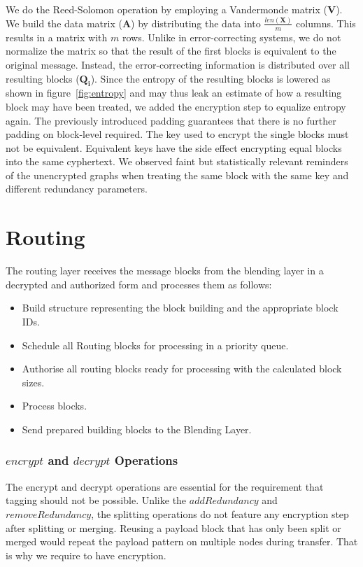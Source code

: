 We do the Reed-Solomon operation by employing a Vandermonde matrix ($\mathbf{V}$). We build the data matrix ($\mathbf{A}$) by distributing the data into $\frac{len\left(\mathbf{X}\right)}{m}$ columns. This results in a matrix with $m$ rows. Unlike in error-correcting systems, we do not normalize the matrix so that the result of the first blocks is equivalent to the original message. Instead, the error-correcting information is distributed over all resulting blocks ($\mathbf{Q_i}$). Since the entropy of the resulting blocks is lowered as shown in figure~\ref{fig:entropy} and may thus leak an estimate of how a resulting block may have been treated, we added the encryption step to equalize entropy again. The previously introduced padding guarantees that there is no further padding on block-level required. The key used to encrypt the single blocks must not be equivalent. Equivalent keys have the side effect encrypting equal blocks into the same cyphertext. We observed faint but statistically relevant reminders of the unencrypted graphs when treating the same block with the same key and different redundancy parameters.

\section{Routing}
The routing layer receives the message blocks from the blending layer in a decrypted and authorized form and processes them as follows:

\begin{itemize}
	\item Build structure representing the block building and the appropriate block IDs.
	\item Schedule all Routing blocks for processing in a priority queue.
	\item Authorise all routing blocks ready for processing with the calculated block sizes.
	\item Process blocks.
	\item Send prepared building blocks to the Blending Layer.
\end{itemize}

\subsubsection{$encrypt$ and $decrypt$ Operations}
The encrypt and decrypt operations are essential for the requirement that tagging should not be possible. Unlike the $addRedundancy$ and $removeRedundancy$, the splitting operations do not feature any encryption step after splitting or merging. Reusing a payload block that has only been split or merged would repeat the payload pattern on multiple nodes during transfer. That is why we require to have encryption.

